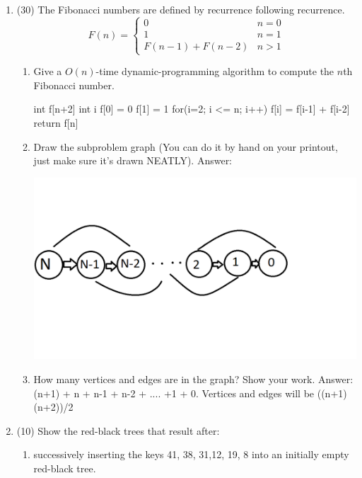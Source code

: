 \documentclass[12pt]{article}
\begin{document}
\begin{enumerate}
\item (30) The Fibonacci numbers are defined by recurrence following recurrence.
\[
 F(n) = \begin{cases}
         0 &n  = 0\\
         1 &n  = 1\\
         F(n-1) + F(n-2) &n > 1
        \end{cases}
\]

\begin{enumerate}
\item Give a $O(n)$-time dynamic-programming algorithm to compute the $n$th Fibonacci number.

\begin{algorithm}[H]
 \begin{algorithmic}[1]
 \State int f[n+2]
 \State int i
 \State f[0] = 0
 \State f[1] = 1
 \State for(i=2; i \textless= n; i++)
 \State \indent f[i] = f[i-1] + f[i-2]
 \State return f[n]
 \EndProcedure
\end{algorithmic}
\end{algorithm}

\item Draw the subproblem graph (You can do it by hand on your printout, just make sure it's 
drawn NEATLY).
\newline Answer:

\includegraphics[scale = 0.25]{Fibon}

\item How many vertices and edges are in the graph? Show your work.
\newline Answer: (n+1) + n + n-1 + n-2 + .... +1 + 0. Vertices and edges will be ((n+1)(n+2))/2
\end{enumerate}

\item (10) Show the red-black trees that result after:
\begin{enumerate}
\item  successively inserting the keys 41, 38, 
31,12, 19, 8 into an initially empty red-black tree.


\end{enumerate}
\end{enumerate}
\end{document}
